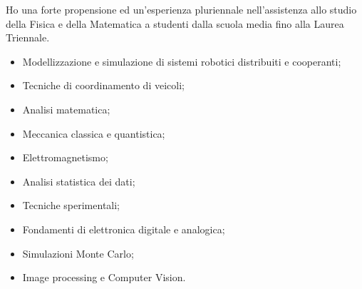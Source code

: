 \documentclass[a4paper,12pt]{article} %
\begin{document}
\Sep 




\Sep
Ho una forte propensione ed un'esperienza pluriennale nell'assistenza allo studio della
Fisica e della Matematica a studenti dalla scuola media fino alla Laurea Triennale. \\




\begin{itemize}
\item Modellizzazione e simulazione di sistemi robotici distribuiti e cooperanti;
\item Tecniche di coordinamento di veicoli;
\item Analisi matematica;
\item Meccanica classica e quantistica;
\item Elettromagnetismo;
\item Analisi statistica dei dati;
\item Tecniche sperimentali;
\item Fondamenti di elettronica digitale e analogica;
\item Simulazioni Monte Carlo;
\item Image processing e Computer Vision.
\end{itemize}
\end{document}
